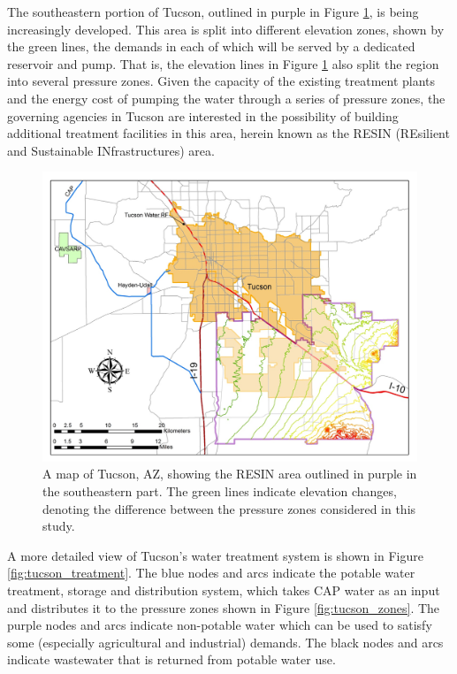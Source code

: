 \documentclass[11pt]{article}
\theoremstyle{plain}
\theoremstyle{definition}
\theoremstyle{remark}
\begin{document}
The southeastern portion of Tucson, outlined in purple in Figure \ref{fig:tucson_elevation}, is being increasingly developed.
This area is split into different elevation zones, shown by the green lines, the demands in each of which will be served by a dedicated reservoir and pump.
That is, the elevation lines in Figure \ref{fig:tucson_elevation} also split the region into several pressure zones.
Given the capacity of the existing treatment plants and the energy cost of pumping the water through a series of pressure zones, the governing agencies in Tucson are interested in the possibility of building additional treatment facilities  in this area, herein known as the RESIN (REsilient and Sustainable INfrastructures) area.

\begin{figure}
	\centering
	\includegraphics*[width=.6\textwidth]{tucson_water_images/tucson_elevation.png}
	\caption{
		A map of Tucson, AZ, showing the RESIN area outlined in purple in the southeastern part.
		The green lines indicate elevation changes, denoting the difference between the pressure zones considered in this study.
	}
	\label{fig:tucson_elevation}
\end{figure}

A more detailed view of Tucson's water treatment system is shown in Figure \ref{fig:tucson_treatment}.
The blue nodes and arcs indicate the potable water treatment, storage and distribution system, which takes CAP water as an input and distributes it to the pressure zones shown in Figure \ref{fig:tucson_zones}.
The purple nodes and arcs indicate non-potable water which can be used to satisfy some (especially agricultural and industrial) demands.
The black nodes and arcs indicate wastewater that is returned from potable water use.
\end{document}
